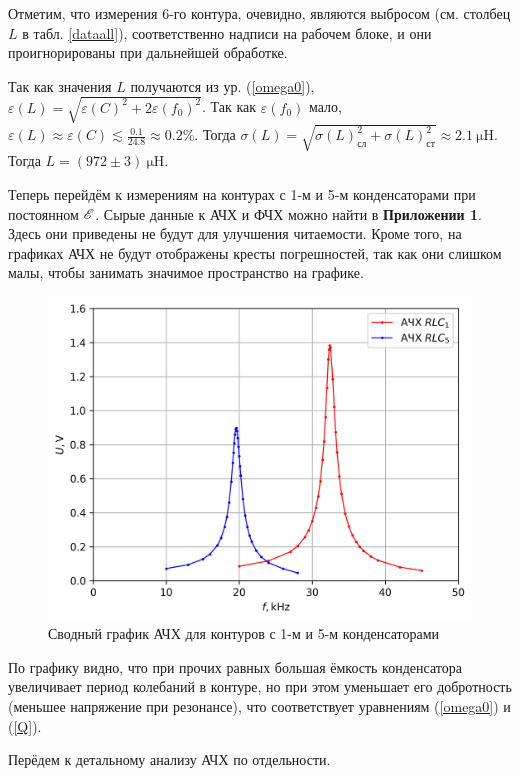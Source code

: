 \documentclass[12pt, a4paper]{article}
\begin{document}
Отметим, что измерения 6-го контура, очевидно, являются выбросом (см. столбец $\textit{L}$ в табл. \ref{dataall}), соответственно надписи на рабочем блоке, и они проигнорированы при дальнейшей обработке.

Так как значения $L$ получаются из ур. (\ref{omega0}), $\varepsilon(L) = \sqrt{\varepsilon(C)^2 + 2 \varepsilon(f_0)^2}$. Так как $\varepsilon(f_0)$ мало,\newline ${\varepsilon(L) \approx \varepsilon(C) \lesssim \frac{0.1}{24.8} \approx 0.2 \%}$. Тогда $\sigma(L) = \sqrt{\sigma(L)_{сл}^2 + \sigma(L)_{ст}^2} \approx 2.1~\mathrm{\mu H}$. Тогда $L = (972 \pm 3)~\mathrm{\mu H}$.

\vspace{1.5em}

Теперь перейдём к измерениям на контурах с 1-м и 5-м конденсаторами при постоянном $\mathscr{E}$. Сырые данные к АЧХ и ФЧХ можно найти в \textbf{Приложении 1}. Здесь они приведены не будут для улучшения читаемости. Кроме того, на графиках АЧХ не будут отображены кресты погрешностей, так как они слишком малы, чтобы занимать значимое пространство на графике.

\begin{figure}[H]
  \centering
  \includegraphics[width = 0.8\linewidth]{afc15.png}
  \caption{Сводный график АЧХ для контуров с 1-м и 5-м конденсаторами}
\end{figure}

По графику видно, что при прочих равных большая ёмкость конденсатора увеличивает период колебаний в контуре, но при этом уменьшает его добротность (меньшее напряжение при резонансе), что соответствует уравнениям (\ref{omega0}) и (\ref{Q}).

\newpage
Перёдем к детальному анализу АЧХ по отдельности.
\end{document}
